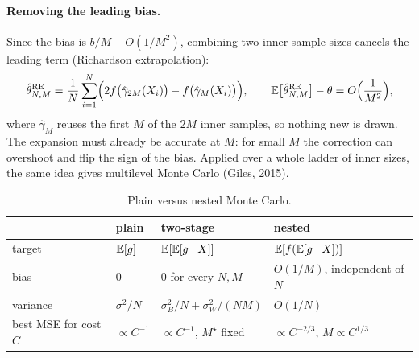\begin{notechapter}
\paragraph{Removing the leading bias.} Since the bias is $b/M + O(1/M^2)$, combining two
inner sample sizes cancels the leading term (Richardson extrapolation):
\[
  \hat\theta^{\mathrm{RE}}_{N,M} = \frac1N\sum_{i=1}^N\Bigl(2f\bigl(\hat\gamma_{2M}(X_i)\bigr) - f\bigl(\hat\gamma_M(X_i)\bigr)\Bigr),
  \qquad \mathbb{E}\bigl[\hat\theta^{\mathrm{RE}}_{N,M}\bigr] - \theta = O\Bigl(\frac1{M^2}\Bigr),
\]
where $\hat\gamma_M$ reuses the first $M$ of the $2M$ inner samples, so nothing new is
drawn. The expansion must already be accurate at $M$: for small $M$ the correction
can overshoot and flip the sign of the bias. Applied over a whole ladder of inner
sizes, the same idea gives multilevel Monte Carlo (Giles, 2015).

\begin{table}[ht]
\centering
\caption{Plain versus nested Monte Carlo.}
\label{monte-carlo:tab:comparison}
\begin{tabular}{@{}llll@{}}
\toprule
 & plain & two-stage & nested \\
\midrule
target & $\mathbb{E}[g]$ & $\mathbb{E}[\mathbb{E}[g\mid X]]$ & $\mathbb{E}[f(\mathbb{E}[g\mid X])]$ \\
bias & $0$ & $0$ for every $N, M$ & $O(1/M)$, independent of $N$ \\
variance & $\sigma^2/N$ & $\sigma_B^2/N + \sigma_W^2/(NM)$ & $O(1/N)$ \\
best MSE for cost $C$ & $\propto C^{-1}$ & $\propto C^{-1}$, $M^\star$ fixed & $\propto C^{-2/3}$, $M\propto C^{1/3}$ \\
\bottomrule
\end{tabular}
\end{table}


\end{notechapter}
